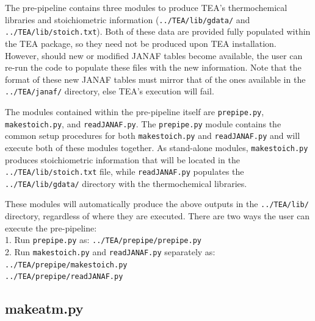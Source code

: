 {The pre-pipeline contains three modules to produce TEA's
thermochemical libraries and stoichiometric information
(\texttt{../TEA/lib/gdata/} and \texttt{../TEA/lib/stoich.txt}). Both
of these data are provided fully populated within the TEA package, so
they need not be produced upon TEA installation. However, should new
or modified JANAF tables become available, the user can re-run the
code to populate these files with the new information. Note that the
format of these new JANAF tables must mirror that of the ones
available in the
\texttt{../TEA/janaf/} directory, else TEA's execution will fail.

The modules contained within the pre-pipeline itself are
\texttt{prepipe.py}, \texttt{makestoich.py}, and
\texttt{readJANAF.py}. The \texttt{prepipe.py} module contains the
common setup procedures for both \texttt{makestoich.py} and
\texttt{readJANAF.py} and will execute both of these modules
together. As stand-alone modules, \texttt{makestoich.py} produces
stoichiometric information that will be located in the
\texttt{../TEA/lib/stoich.txt} file, while \texttt{readJANAF.py}
populates the \newline \texttt{../TEA/lib/gdata/} directory with the
thermochemical libraries.

These modules will automatically produce the above outputs in
the \texttt{../TEA/lib/} directory, regardless of where they are
executed. There are two ways the user can execute the pre-pipeline:\\
1. Run \texttt{prepipe.py} as:
\texttt{../TEA/prepipe/prepipe.py}\\ 2. Run \texttt{makestoich.py} and
\texttt{readJANAF.py} separately as:\\ 
\texttt{../TEA/prepipe/makestoich.py}\\ 
\texttt{../TEA/prepipe/readJANAF.py}



\subsection{makeatm.py}
\label{exec-makeatm}

}

